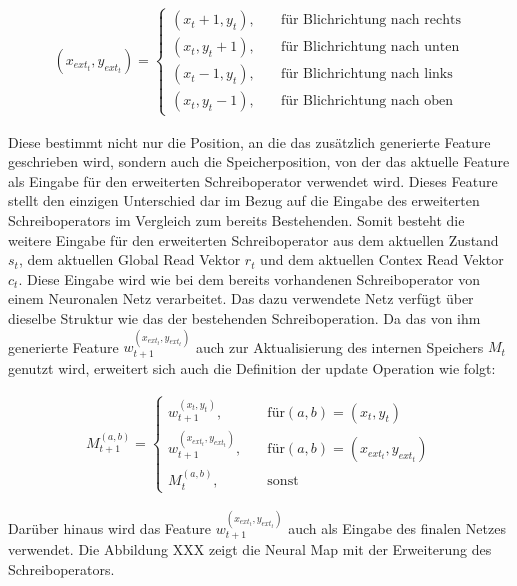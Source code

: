 \begin{equation}
\begin{aligned}
(x_{ext_t}, y_{ext_t}) =
\begin{cases}
(x_t + 1,y_t), & \quad \text{für Blichrichtung nach rechts} \\
(x_t,y_t + 1), & \quad \text{für Blichrichtung nach unten} \\
(x_t - 1,y_t), & \quad \text{für Blichrichtung nach links} \\
(x_t,y_t - 1), & \quad \text{für Blichrichtung nach oben}
\end{cases}
\end{aligned}
\end{equation}

Diese bestimmt nicht nur die Position, an die das zusätzlich generierte Feature geschrieben wird, sondern auch die Speicherposition, von der das aktuelle Feature als Eingabe für den erweiterten Schreiboperator verwendet wird. Dieses Feature stellt den einzigen Unterschied dar im Bezug auf die Eingabe des erweiterten Schreiboperators im Vergleich zum bereits Bestehenden. Somit besteht die weitere Eingabe für den erweiterten Schreiboperator aus dem aktuellen Zustand $s_t$, dem aktuellen Global Read Vektor $r_t$ und dem aktuellen Contex Read Vektor $c_t$.
Diese Eingabe wird wie bei dem bereits vorhandenen Schreiboperator von einem Neuronalen Netz verarbeitet. Das dazu verwendete Netz verfügt über dieselbe Struktur wie das der bestehenden Schreiboperation. Da das von ihm generierte Feature $w_{t+1}^{(x_{ext_t},y_{ext_t})}$ auch zur Aktualisierung des internen Speichers $M_t$ genutzt wird, erweitert sich auch die Definition der update Operation wie folgt:

\begin{equation}
 \begin{aligned}
 M_{t+1}^{(a,b)} =
 \begin{cases}
 w_{t+1}^{(x_t,y_t)}, & \quad \text{für} (a,b) = (x_t,y_t) \\
 w_{t+1}^{(x_{ext_t},y_{ext_t})}, & \quad \text{für} (a,b) = (x_{ext_t},y_{ext_t}) \\
 M_t^{(a,b)}, & \quad \text{sonst}
 \end{cases}
 \end{aligned}
\end{equation}

Darüber hinaus wird das Feature $w_{t+1}^{(x_{ext_t},y_{ext_t})}$ auch als Eingabe des finalen Netzes verwendet. Die Abbildung XXX zeigt die Neural Map mit der Erweiterung des Schreiboperators.
